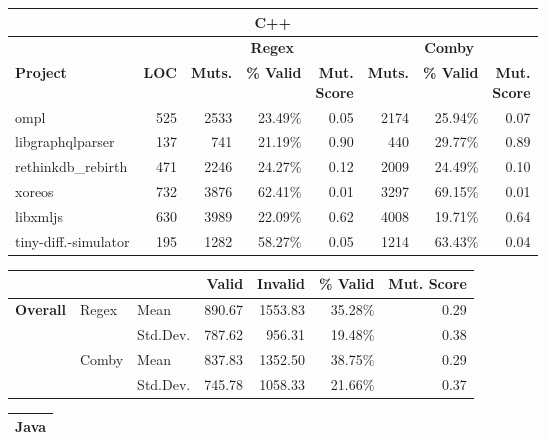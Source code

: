 \documentclass[acmsmall]{acmart}
\newcommand{\mc}[3]{\multicolumn{#1}{#2}{#3}}
\begin{document}
{\begin{table}[hbtp]
\begin{varwidth}{.8\linewidth}
\begin{tabularx}{\linewidth}{X|r|rrr|rrr}
\bottomrule\toprule
\mc{8}{c}{\textbf{C++}} \\\midrule
                 &              & \multicolumn{3}{c|}{\textbf{Regex}} &\multicolumn{3}{c}{\textbf{Comby}}  \\
\textbf{Project} & \textbf{LOC} & \textbf{Muts.} & \textbf{\% Valid} & \makecell{\textbf{Mut.} \\ \textbf{Score}} &  \textbf{Muts.} &  \textbf{\% Valid} & \makecell{\textbf{Mut.} \\ \textbf{Score}} \\\midrule
ompl & 525 & 2533 & 23.49\% & 0.05 & 2174  & 25.94\% & 0.07  \\
{libgraphqlparser} & 137 & 741 & 21.19\% & 0.90 & 440 & 29.77\% & 0.89\\
{rethinkdb\_rebirth} &471 & 2246 & 24.27\% & 0.12 & 2009 & 24.49\% & 0.10\\
xoreos & 732  & 3876  & 62.41\% & 0.01 & 3297 & 69.15\% & 0.01\\
libxmljs &630 &  3989 & 22.09\% & 0.62 & 4008 & 19.71\% &
0.64 \\[0.5ex]
tiny-diff.-simulator &  195 & 1282 &58.27\% & 0.05 & 1214 & 63.43\% & 0.04\\
\bottomrule
\end{tabularx}
\begin{tabularx}{\linewidth}{Xllrrrr}
                  & &       & \textbf{Valid}  & \textbf{Invalid}  & \textbf{\% Valid} & \textbf{Mut. Score} \\\midrule
 \multirow{4}{*}{\textbf{Overall}} & \multirow{2}{*}{Regex} & Mean     & 890.67 &  1553.83 & 35.28\% & 0.29\\
                          & & Std.Dev. & 787.62 & 956.31   & 19.48\%  & 0.38\\\cline{2-7}
  & \multirow{2}{*}{Comby}  & Mean     & 837.83 & 1352.50 & 38.75\%  & 0.29\\
                         & & Std.Dev. & 745.78 & 1058.33 & 21.66\% & 0.37 \\\bottomrule
 \end{tabularx}
\begin{tabularx}{\linewidth}{X|r|crr|crr}
\toprule
\mc{8}{c}{\textbf{Java}} \\\midrule

\end{tabularx}
\end{varwidth}
\end{table}}
\end{document}
